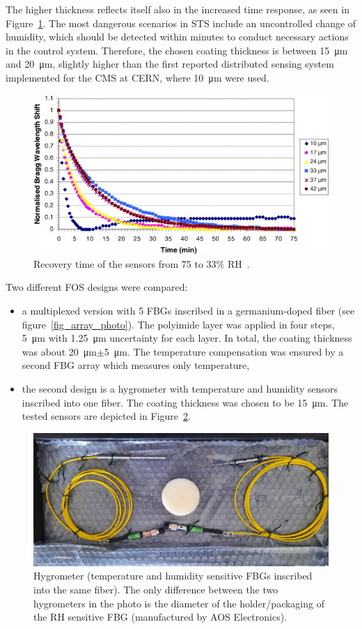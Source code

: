 The higher thickness reflects itself also in the increased time response, as seen in Figure~\ref{fig:yeo2}. The most dangerous scenarios in \gls{STS} include an uncontrolled change of humidity, which should be detected within minutes to conduct necessary actions in the control system. Therefore, the chosen coating thickness is between \SI{15}{\micro\metre} and \SI{20}{\micro\metre}, slightly higher than the first reported distributed sensing system implemented for the \gls{CMS} at \gls{CERN}, where \SI{10}{\micro\metre} were used. 
\begin{figure}[!h]
\centering
\includegraphics[width=0.80\columnwidth]{Chapter5/images/time_response_yeo.jpg}
\caption{Recovery time of the sensors from 75 to 33\% RH~\cite{YEO_PI}.}
\label{fig:yeo2}
\end{figure}
\newpage
Two different \gls{FOS} designs were compared:
\begin{itemize}
    \item a multiplexed version with 5 \glspl{FBG} inscribed in a germanium-doped fiber (see figure~\ref{fig_array_photo}). The polyimide layer was applied in four steps, \SI{5}{\micro\metre} with \SI{1.25}{\micro\metre} uncertainty for each layer. In total, the coating thickness was about \SI{20}{\micro\metre}$\pm$\SI{5}{\micro\metre}. The temperature compensation was ensured by a second \gls{FBG} array which measures only temperature,
    \item the second design is a hygrometer with temperature and humidity sensors inscribed into one fiber. The coating thickness was chosen to be \SI{15}{\micro\metre}. The tested sensors are depicted in Figure~\ref{fig_single_photo}.
\end{itemize}

\begin{figure}[!h]
\centering
\includegraphics[width=0.7\columnwidth]{Chapter5/images/single1.jpeg}
\caption{Hygrometer (temperature and humidity sensitive \glspl{FBG} inscribed into the same fiber). The only difference between the two hygrometers in the photo is the diameter of the holder/packaging of the \gls{RH} sensitive \gls{FBG} (manufactured by AOS Electronics).}
\label{fig_single_photo}
\end{figure}


